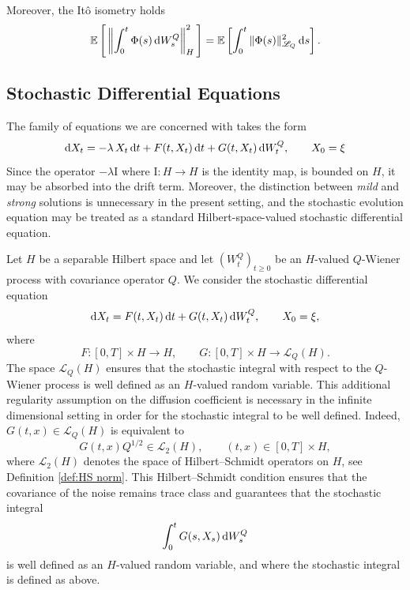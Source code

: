 \documentclass[12pt]{amsart}
\newcommand{\D}[1]{\mbox{\rm #1}}
\newcommand{\dd}{\D{d}}
\numberwithin{equation}{section}
\begin{document}
Moreover, the Itô isometry holds
\begin{equation}\label{eq: ito isom}
    \mathbb{E}\left[\, \left\| \int_0^t \Phi(s)\,\dd W_s^Q \right\|_H^2\,\right]
    =
    \mathbb{E}\left[ \int_0^t \|\Phi(s)\|_{\mathscr L_Q}^2 \,\dd s\right].
\end{equation}

\subsection{Stochastic Differential Equations}\label{subsec: SDE H}

The family of equations we are concerned with takes the form
\[
    \dd X_t = -\lambda\,X_t\,\dd t + F(t,X_t)\,\dd t + G(t,X_t)\,\dd W_{t}^{Q}, \qquad X_0 = \xi
\]
Since the operator $-\lambda \mathrm{I}$ where $\mathrm{I}:H\to H$ is the identity map, is bounded on $H$, it may be absorbed into the drift term. 
Moreover, the distinction between \textit{mild} and \textit{strong} solutions is unnecessary in the present setting, and the stochastic evolution equation may be treated as a standard Hilbert-space-valued stochastic differential equation.

Let $H$ be a separable Hilbert space and let $(W_t^Q)_{t\geq0}$ be an $H$-valued $Q$-Wiener process with covariance operator $Q$. We consider the stochastic differential equation
\[
    \dd X_t = F(t,X_t)\,\dd t + G(t,X_t)\,\dd W_t^Q, \qquad X_0=\xi,
\]
where
\[
    F:[0,T]\times H\to H, \qquad G:[0,T]\times H\to \mathscr L_Q(H).
\]
The space $\mathscr{L}_Q(H)$ ensures that the stochastic integral with respect to the $Q$-Wiener process is well defined as an $H$-valued random variable. This additional regularity assumption on the diffusion coefficient is necessary in the infinite dimensional setting in order for the stochastic integral to be well defined. Indeed, $G(t,x)\in \mathscr L_Q(H)$ is equivalent to
\[
    G(t,x)Q^{1/2}\in \mathscr{L}_2(H), \qquad (t,x)\in [0,T]\times H,
\]
where $\mathscr{L}_2(H)$ denotes the space of Hilbert--Schmidt operators on $H$, see Definition \ref{def:HS norm}. This Hilbert--Schmidt condition ensures that the covariance of the noise remains trace class and guarantees that the stochastic integral
\[
    \int_0^t G(s,X_s)\,\dd W_s^Q
\]
is well defined as an $H$-valued random variable, and where the stochastic integral is defined as above.

\end{document}
